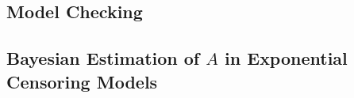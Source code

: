 \subsection{Model Checking}\label{sec:model checking}


\subsection{Bayesian Estimation of \texorpdfstring{$A$}{A} in Exponential Censoring Models}

















